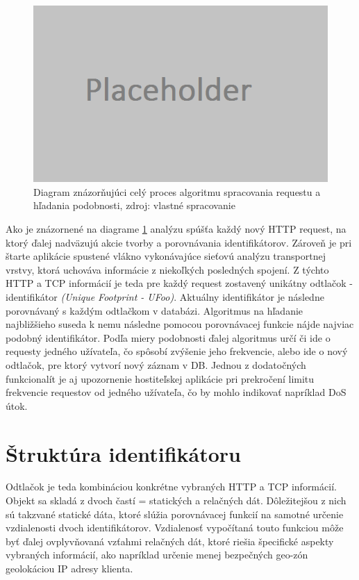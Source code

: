 \documentclass[
  printed, %
  table,   %
  lof,     %
  lot,     %
]{fithesis3}
\begin{document}
\begin{figure}[h]
  \centering
    \includegraphics[width=.99\textwidth]{images/footprint-hl.png}
  \caption{Diagram znázorňujúci celý proces algoritmu spracovania requestu a
  hľadania podobnosti, zdroj: vlastné spracovanie}
  \label{fig:footprint-hl}
\end{figure}

Ako je znázornené na diagrame \ref{fig:footprint-hl} analýzu spúšťa každý nový
HTTP request, na ktorý ďalej nadväzujú akcie tvorby a porovnávania
identifikátorov. Zároveň je pri štarte aplikácie spustené vlákno vykonávajúce
sieťovú analýzu transportnej vrstvy, ktorá uchováva informácie z niekoľkých
posledných spojení. Z týchto HTTP a TCP informácií je teda pre každý request
zostavený unikátny odtlačok - identifikátor \textit{(Unique Footprint - UFoo)}.
Aktuálny identifikátor je následne porovnávaný s každým odtlačkom v databázi.
Algoritmus na hľadanie najbližšieho suseda k nemu následne pomocou porovnávacej
funkcie nájde najviac podobný identifikátor. Podľa miery podobnosti ďalej
algoritmus určí či ide o requesty jedného užívateľa, čo spôsobí zvýšenie jeho
frekvencie, alebo ide o nový odtlačok, pre ktorý vytvorí nový záznam v DB.
Jednou z dodatočných funkcionalít je aj upozornenie hostiteľskej aplikácie pri
prekročení limitu frekvencie requestov od jedného užívateľa, čo by mohlo
indikovať napríklad DoS útok.

\section{Štruktúra identifikátoru}
Odtlačok je teda kombináciou konkrétne vybraných HTTP a TCP informácií.
Objekt sa skladá z dvoch častí = statických a relačných dát. Dôležitejšou z
nich sú takzvané statické dáta, ktoré slúžia porovnávacej funkcií na samotné
určenie vzdialenosti dvoch identifikátorov. Vzdialenosť vypočítaná touto
funkciou môže byť ďalej ovplyvňovaná vzťahmi relačných dát, ktoré riešia
špecifické aspekty vybraných informácií, ako napríklad určenie menej bezpečných
geo-zón geolokáciou IP adresy klienta.
\end{document}

